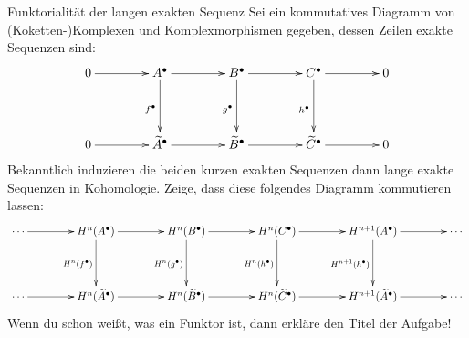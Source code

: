 \documentclass{uebblatt}
\begin{document}

\begin{aufgabe}{Funktorialität der langen exakten Sequenz}
Sei ein kommutatives Diagramm von (Koketten-)Komplexen und Komplexmorphismen gegeben,
dessen Zeilen exakte Sequenzen sind:
\[ \xymatrixcolsep{3.5pc}\xymatrixrowsep{3.5pc}\xymatrix{
  0 \ar[r]
    & A^\bullet \ar[r] \ar[d]_{f^\bullet}
    & B^\bullet \ar[r] \ar[d]_{g^\bullet}
    & C^\bullet \ar[r] \ar[d]_{h^\bullet}
    & 0 \\
  0 \ar[r]
    & \widetilde A^\bullet \ar[r]
    & \widetilde B^\bullet \ar[r]
    & \widetilde C^\bullet \ar[r]
    & 0
} \]
Bekanntlich induzieren die beiden kurzen exakten Sequenzen dann lange exakte
Sequenzen in Kohomologie. Zeige, dass diese folgendes Diagramm kommutieren
lassen:
\[ \xymatrixcolsep{3.5pc}\xymatrixrowsep{3.5pc}\xymatrix{
  \cdots \ar[r]
    & H^n(A^\bullet) \ar[r] \ar[d]_{H^n(f^\bullet)}
    & H^n(B^\bullet) \ar[r] \ar[d]_{H^n(g^\bullet)}
    & H^n(C^\bullet) \ar[r] \ar[d]_{H^n(h^\bullet)}
    & H^{n+1}(A^\bullet) \ar[r] \ar[d]_{H^{n+1}(h^\bullet)}
    & \cdots \\
  \cdots \ar[r]
    & H^n(\widetilde A^\bullet) \ar[r]
    & H^n(\widetilde B^\bullet) \ar[r]
    & H^n(\widetilde C^\bullet) \ar[r]
    & H^{n+1}(\widetilde A^\bullet) \ar[r]
    & \cdots
} \]
Wenn du schon weißt, was ein Funktor ist, dann erkläre den Titel der Aufgabe!
\end{aufgabe}
\end{document}
